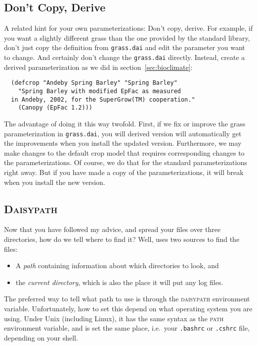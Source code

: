 \documentclass[a4paper,11pt]{article}
\begin{document}
\subsection{Don't Copy, Derive}

A related hint for your own parameterizations: Don't copy, derive.
For example, if you want a slightly different grass than the one
provided by the standard \daisy{} library, don't just copy the
definition from \texttt{grass.dai} and edit the parameter you want to
change.  And certainly don't change the \texttt{grass.dai} directly.
Instead, create a derived parameterization as we did in
section~\ref{sec:bioclimate}:
\begin{verbatim}
  (defcrop "Andeby Spring Barley" "Spring Barley"
    "Spring Barley with modified EpFac as measured
  in Andeby, 2002, for the SuperGrow(TM) cooperation."
    (Canopy (EpFac 1.2)))
\end{verbatim}
The advantage of doing it this way twofold.  First, if we fix or
improve the grass parameterization in \texttt{grass.dai}, you will
derived version will automatically get the improvements when you
install the updated \daisy{} version.  Furthermore, we may make
changes to the default crop model that requires corresponding changes
to the parameterizations.  Of course, we do that for the standard
parameterizations right away.  But if you have made a copy of the
parameterizations, it will break when you install the new version.

\subsection{\textsc{Daisypath}}
\label{sec:daisypath}

Now that you have followed my advice, and spread your files over three
directories, how do we tell \daisy{} where to find it?  Well, \daisy{}
uses two sources to find the files:
\begin{itemize}
\item A \emph{path} containing information about which directories to
  look, and
\item the \emph{current directory}, which is also the place it will
  put any log files. 
\end{itemize}

The preferred way to tell \daisy{} what path to use is through the
\textsc{daisypath} environment variable.  Unfortunately, how to set
this depend on what operating system you are using.  Under Unix
(including Linux), it has the same syntax as the \textsc{path}
environment variable, and is set the same place, i.e.\ your
\texttt{.bashrc} or \texttt{.cshrc} file, depending on your shell. 
\end{document}
